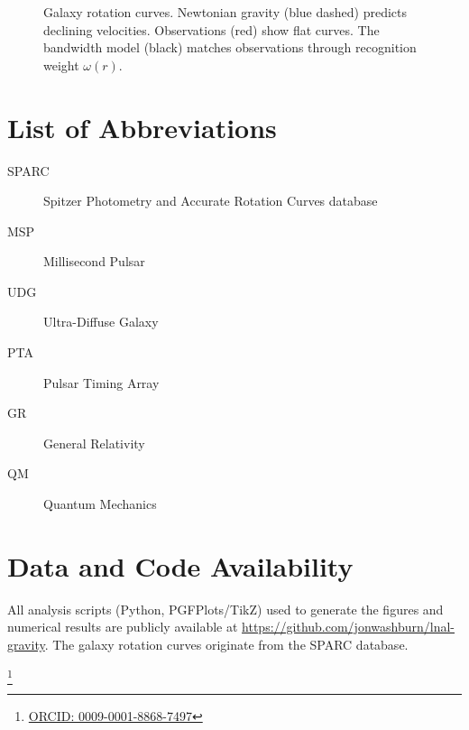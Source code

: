 \documentclass[twocolumn,prd,amsmath,amssymb,aps,superscriptaddress,nofootinbib]{revtex4-2}
\newcommand{\wrec}{\omega}  %
\begin{document}
\begin{figure}[h]
\centering
{}
\caption{Galaxy rotation curves. Newtonian gravity (blue dashed) predicts declining velocities. Observations (red) show flat curves. The bandwidth model (black) matches observations through recognition weight $\wrec(r)$.}
\label{fig:rotation}
\end{figure}

\section*{List of Abbreviations}
\begin{description}
  \item[SPARC] Spitzer Photometry and Accurate Rotation Curves database
  \item[MSP] Millisecond Pulsar
  \item[UDG] Ultra-Diffuse Galaxy
  \item[PTA] Pulsar Timing Array
  \item[GR] General Relativity
  \item[QM] Quantum Mechanics
\end{description}

\section*{Data and Code Availability}
All analysis scripts (Python, PGFPlots/TikZ) used to generate the figures and numerical results are publicly available at \url{https://github.com/jonwashburn/lnal-gravity}. The galaxy rotation curves originate from the SPARC database\cite{Lelli2016}.

\thanks{\href{https://orcid.org/0009-0001-8868-7497}{ORCID: 0009-0001-8868-7497}}
\end{document}

